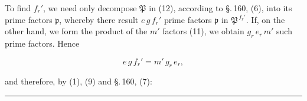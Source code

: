 
To find $f_r'$, we need only decompose $\mathfrak{P}$ in (12), according to \S.\,160, (6),
into its prime factors $\mathfrak{p}$, whereby there result $e\,g\,f_r'$ prime factors
$\mathfrak{p}$ in $\mathfrak{P}^{\,f_r'}$. If, on the other hand, we form the product
of the $m'$ factors (11), we obtain $g_r\,e_r\,m'$ such prime factors.
Hence

\[
e\,g\,f_r' = m'\,g_r\,e_r,
\]

and therefore, by (1), (9) and \S.\,160, (7):


\begin{center}
\rule{0.3\linewidth}{0.4pt}
\end{center}
